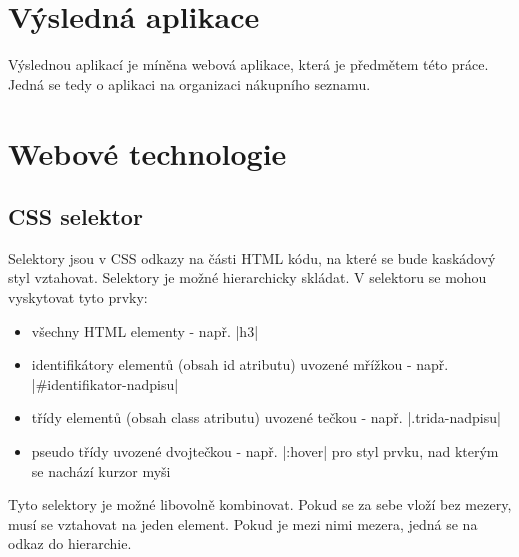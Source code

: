 \section{Výsledná aplikace}
Výslednou aplikací je míněna webová aplikace, která je předmětem této práce. Jedná se tedy o aplikaci na organizaci nákupního seznamu.

\section{Webové technologie}
\subsection{CSS selektor}
\label{sec:css-selektor}
Selektory jsou v CSS odkazy na části HTML kódu, na které se bude kaskádový styl vztahovat. Selektory je možné hierarchicky skládat. V selektoru se mohou vyskytovat tyto prvky:
\begin{itemize}
\item všechny HTML elementy - např. |h3|
\item identifikátory elementů (obsah id atributu) uvozené mřížkou - např. |#identifikator-nadpisu|
\item třídy elementů (obsah class atributu) uvozené tečkou - např. |.trida-nadpisu|
\item pseudo třídy uvozené dvojtečkou - např. |:hover| pro styl prvku, nad kterým se nachází kurzor myši
\end{itemize}
Tyto selektory je možné libovolně kombinovat. Pokud se za sebe vloží bez mezery, musí se vztahovat na jeden element. Pokud je mezi nimi mezera, jedná se na odkaz do hierarchie.
